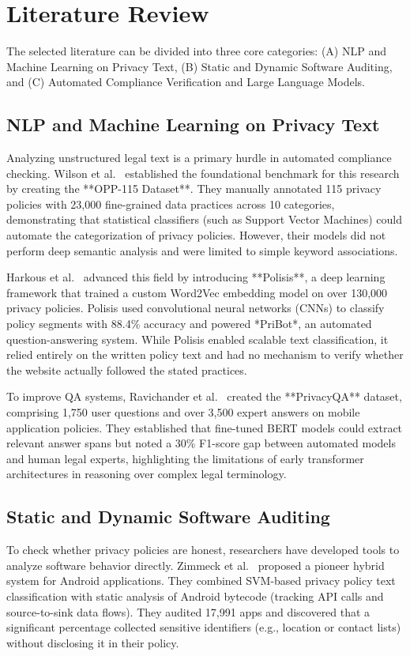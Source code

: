 \documentclass[11pt,a4paper]{article}
\begin{document}
\section{Literature Review}
The selected literature can be divided into three core categories: (A) NLP and Machine Learning on Privacy Text, (B) Static and Dynamic Software Auditing, and (C) Automated Compliance Verification and Large Language Models.

\subsection{NLP and Machine Learning on Privacy Text}
Analyzing unstructured legal text is a primary hurdle in automated compliance checking. Wilson et al.~\cite{wilson-2016-opp115} established the foundational benchmark for this research by creating the **OPP-115 Dataset**. They manually annotated 115 privacy policies with 23,000 fine-grained data practices across 10 categories, demonstrating that statistical classifiers (such as Support Vector Machines) could automate the categorization of privacy policies. However, their models did not perform deep semantic analysis and were limited to simple keyword associations.

Harkous et al.~\cite{harkous-2018-polisis} advanced this field by introducing **Polisis**, a deep learning framework that trained a custom Word2Vec embedding model on over 130,000 privacy policies. Polisis used convolutional neural networks (CNNs) to classify policy segments with 88.4\% accuracy and powered *PriBot*, an automated question-answering system. While Polisis enabled scalable text classification, it relied entirely on the written policy text and had no mechanism to verify whether the website actually followed the stated practices.

To improve QA systems, Ravichander et al.~\cite{ravichander-2019-privacyqa} created the **PrivacyQA** dataset, comprising 1,750 user questions and over 3,500 expert answers on mobile application policies. They established that fine-tuned BERT models could extract relevant answer spans but noted a 30\% F1-score gap between automated models and human legal experts, highlighting the limitations of early transformer architectures in reasoning over complex legal terminology.

\subsection{Static and Dynamic Software Auditing}
To check whether privacy policies are honest, researchers have developed tools to analyze software behavior directly. Zimmeck et al.~\cite{zimmeck-2017-inconsistency} proposed a pioneer hybrid system for Android applications. They combined SVM-based privacy policy text classification with static analysis of Android bytecode (tracking API calls and source-to-sink data flows). They audited 17,991 apps and discovered that a significant percentage collected sensitive identifiers (e.g., location or contact lists) without disclosing it in their policy.
\end{document}
